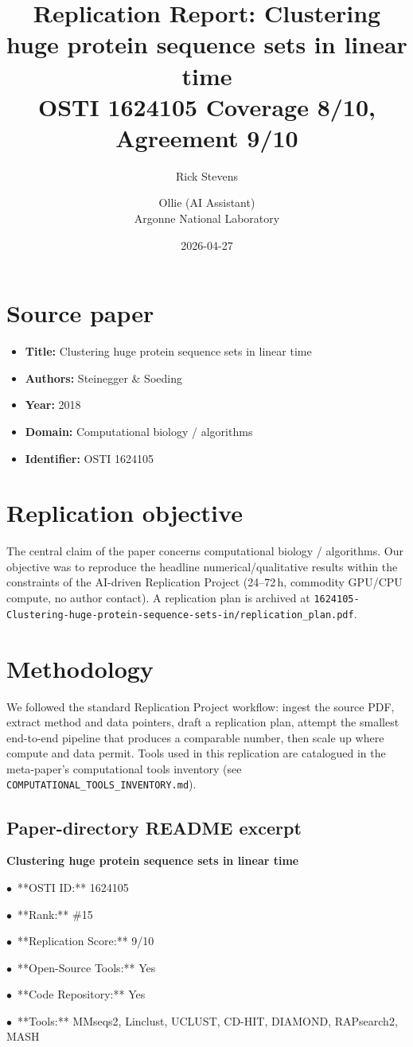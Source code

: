 \documentclass[11pt]{article}
\title{Replication Report: Clustering huge protein sequence sets in linear time\\[2pt]\large OSTI 1624105 \textbar{} Coverage 8/10, Agreement 9/10}
\author{Rick Stevens \and Ollie (AI Assistant)\\\small Argonne National Laboratory}
\date{2026-04-27}
\begin{document}
\maketitle

\section{Source paper}
\begin{itemize}
\item \textbf{Title:} Clustering huge protein sequence sets in linear time
\item \textbf{Authors:} Steinegger \& Soeding
\item \textbf{Year:} 2018
\item \textbf{Domain:} Computational biology / algorithms
\item \textbf{Identifier:} OSTI 1624105
\end{itemize}


\section{Replication objective}
The central claim of the paper concerns computational biology / algorithms. Our objective was to reproduce the headline numerical/qualitative results within the constraints of the AI-driven Replication Project (24--72\,h, commodity GPU/CPU compute, no author contact). A replication plan is archived at \texttt{1624105-Clustering-huge-protein-sequence-sets-in/replication\_plan.pdf}.

\section{Methodology}
We followed the standard Replication Project workflow: ingest the source PDF, extract method and data pointers, draft a replication plan, attempt the smallest end-to-end pipeline that produces a comparable number, then scale up where compute and data permit. Tools used in this replication are catalogued in the meta-paper's computational tools inventory (see \texttt{COMPUTATIONAL\_TOOLS\_INVENTORY.md}).



\subsection*{Paper-directory README excerpt}
\small
\par\medskip\textbf{Clustering huge protein sequence sets in linear time}\par
\par$\bullet$\ **OSTI ID:** 1624105
\par$\bullet$\ **Rank:** \#15
\par$\bullet$\ **Replication Score:** 9/10
\par$\bullet$\ **Open-Source Tools:** Yes
\par$\bullet$\ **Code Repository:** Yes
\par$\bullet$\ **Tools:** MMseqs2, Linclust, UCLUST, CD-HIT, DIAMOND, RAPsearch2, MASH
\end{document}
